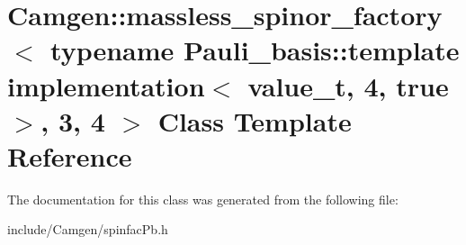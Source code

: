 \hypertarget{a00361}{}\section{Camgen\+:\+:massless\+\_\+spinor\+\_\+factory$<$ typename Pauli\+\_\+basis\+:\+:template implementation$<$ value\+\_\+t, 4, true $>$, 3, 4 $>$ Class Template Reference}
\label{a00361}


The documentation for this class was generated from the following file\+:\begin{DoxyCompactItemize}
\item 
include/\+Camgen/spinfac\+Pb.\+h\end{DoxyCompactItemize}

